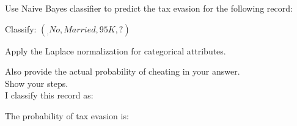 \documentclass{article}
\begin{document}
Use Naive Bayes classifier to predict the tax evasion for the following record:

Classify: $(_, No, Married, 95K, ?)$

Apply the Laplace normalization for categorical attributes. 

Also provide the actual probability of cheating in your answer.\\


Show your steps.\\

I classify this record as: 

The probability of tax evasion is:
\end{document}
